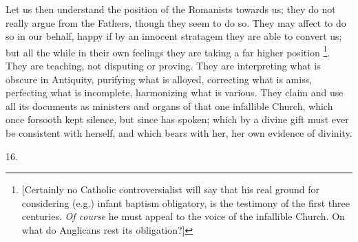 Let us then understand the position of the Romanists towards us;
they do not really argue from the Fathers, though they seem to do so.
They may affect to do so in our behalf, happy if by an innocent
stratagem they are able to convert us; but all the while in their own
feelings they are taking a far higher position \footnote{[Certainly no Catholic controversialist
will say that his real ground for considering (e.g.) infant baptism
obligatory, is the testimony of the first three centuries. \emph{Of
course} he must appeal to the voice of the infallible Church. On
what do Anglicans rest its obligation?]}. They are teaching, not disputing or proving. They are
interpreting what is obscure in Antiquity, purifying what is alloyed,
correcting what is amiss, perfecting what is incomplete, harmonizing
what is various. They claim and use all its documents as ministers and
organs of that one infallible Church, which once forsooth kept
silence, but since has spoken; which by a divine gift must ever be
consistent with herself, and which bears with her, her own evidence of
divinity.

16.

